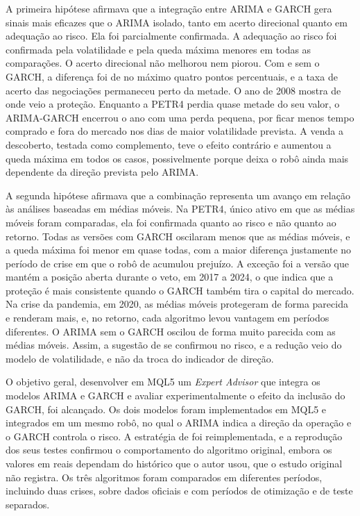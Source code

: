 A primeira hipótese afirmava que a integração entre ARIMA e GARCH gera sinais
mais eficazes que o ARIMA isolado, tanto em acerto direcional quanto em adequação
ao risco. Ela foi parcialmente confirmada. A adequação ao risco foi confirmada
pela volatilidade e pela queda máxima menores em todas as comparações. O acerto
direcional não melhorou nem piorou. Com e sem o GARCH, a diferença foi de no
máximo quatro pontos percentuais, e a taxa de acerto das negociações permaneceu
perto da metade. O ano de 2008 mostra de onde veio a proteção. Enquanto a PETR4
perdia quase metade do seu valor, o ARIMA-GARCH encerrou o ano com uma perda
pequena, por ficar menos tempo comprado e fora do mercado nos dias de maior
volatilidade prevista. A venda a
descoberto, testada como complemento, teve o efeito contrário e aumentou a queda
máxima em todos os casos, possivelmente porque deixa o robô ainda mais dependente
da direção prevista pelo ARIMA.

A segunda hipótese afirmava que a combinação representa um avanço em relação às
análises baseadas em médias móveis. Na PETR4, único ativo em que as médias móveis
foram comparadas, ela foi confirmada quanto ao risco e não quanto ao retorno.
Todas as versões com GARCH oscilaram menos que as médias móveis, e a queda
máxima foi menor em quase todas, com a maior diferença justamente no período de
crise em que o robô de  acumulou prejuízo. A exceção foi a
versão que mantém a posição aberta durante o veto, em 2017 a 2024, o que indica
que a proteção é mais consistente quando o GARCH também tira o capital do mercado.
Na crise da pandemia, em 2020, as médias móveis protegeram de forma parecida e
renderam mais, e, no retorno, cada algoritmo levou vantagem em períodos
diferentes. O ARIMA sem o GARCH oscilou de forma muito parecida com as médias
móveis. Assim, a sugestão de  se confirmou no risco, e a
redução veio do modelo de volatilidade, e não da troca do indicador de direção.

O objetivo geral, desenvolver em MQL5 um \textit{Expert Advisor} que integra os
modelos ARIMA e GARCH e avaliar experimentalmente o efeito da inclusão do GARCH,
foi alcançado. Os dois modelos foram implementados em MQL5 e integrados em um
mesmo robô, no qual o ARIMA indica a direção da operação e o GARCH controla o
risco. A estratégia de  foi reimplementada, e a reprodução
dos seus testes confirmou o comportamento do algoritmo original, embora os valores
em reais dependam do histórico que o autor usou, que o estudo original não
registra. Os três algoritmos foram comparados em diferentes períodos, incluindo
duas crises, sobre dados oficiais e com períodos de otimização e de teste
separados.

